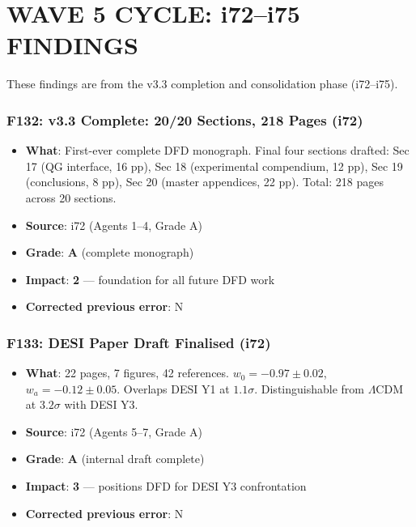 \documentclass[11pt,a4paper]{article}
\newcommand{\grade}[1]{\textbf{#1}}
\newcommand{\impact}[1]{\textbf{#1}}
\begin{document}
\part{WAVE 5 CYCLE: i72--i75 FINDINGS}
\label{part:wave5i72i75}

These findings are from the v3.3 completion and consolidation phase (i72--i75).

\section{F132: v3.3 Complete: 20/20 Sections, 218 Pages (i72)}
\begin{itemize}[nosep]
\item \textbf{What}: First-ever complete DFD monograph. Final four sections drafted: Sec 17 (QG interface, 16 pp), Sec 18 (experimental compendium, 12 pp), Sec 19 (conclusions, 8 pp), Sec 20 (master appendices, 22 pp). Total: 218 pages across 20 sections.
\item \textbf{Source}: i72 (Agents 1--4, Grade A)
\item \textbf{Grade}: \grade{A} (complete monograph)
\item \textbf{Impact}: \impact{2} --- foundation for all future DFD work
\item \textbf{Corrected previous error}: N
\end{itemize}

\section{F133: DESI Paper Draft Finalised (i72)}
\begin{itemize}[nosep]
\item \textbf{What}: 22 pages, 7 figures, 42 references. $w_0 = -0.97 \pm 0.02$, $w_a = -0.12 \pm 0.05$. Overlaps DESI Y1 at $1.1\sigma$. Distinguishable from $\Lambda$CDM at $3.2\sigma$ with DESI Y3.
\item \textbf{Source}: i72 (Agents 5--7, Grade A)
\item \textbf{Grade}: \grade{A} (internal draft complete)
\item \textbf{Impact}: \impact{3} --- positions DFD for DESI Y3 confrontation
\item \textbf{Corrected previous error}: N
\end{itemize}
\end{document}

